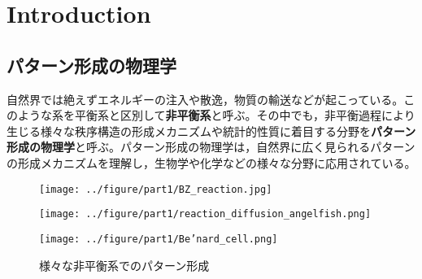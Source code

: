 \documentclass[autodetect-engine,dvi=dvipdfmx,a4paper,ja=standard,oneside,openany,11pt,draft]{bxjsbook}
\begin{document}
\part{Introduction}
\chapter{パターン形成の物理学}
自然界では絶えずエネルギーの注入や散逸，物質の輸送などが起こっている。このような系を平衡系と区別して\textbf{非平衡系}と呼ぶ。その中でも，非平衡過程により生じる様々な秩序構造の形成メカニズムや統計的性質に着目する分野を\textbf{パターン形成の物理学}と呼ぶ。パターン形成の物理学は，自然界に広く見られるパターンの形成メカニズムを理解し，生物学や化学などの様々な分野に応用されている。
\begin{figure}
  \centering
  \begin{minipage}
    {0.32\textwidth}
    \centering
    \texttt{[image: ../figure/part1/BZ\_reaction.jpg]}
    \label{fig:BZ}
  \end{minipage}
  \begin{minipage}
    {0.32\textwidth}
    \centering
    \texttt{[image: ../figure/part1/reaction\_diffusion\_angelfish.png]}
    \label{fig:reaction_diffusion_angelfish}
  \end{minipage}
  \begin{minipage}
    {0.32\textwidth}
    \centering
    \texttt{[image: ../figure/part1/Be’nard\_cell.png]}
    \label{fig:Be’nard_cell}
  \end{minipage}
  \caption{様々な非平衡系でのパターン形成}
  \label{fig:pattern_formation}
\end{figure}
\end{document}

